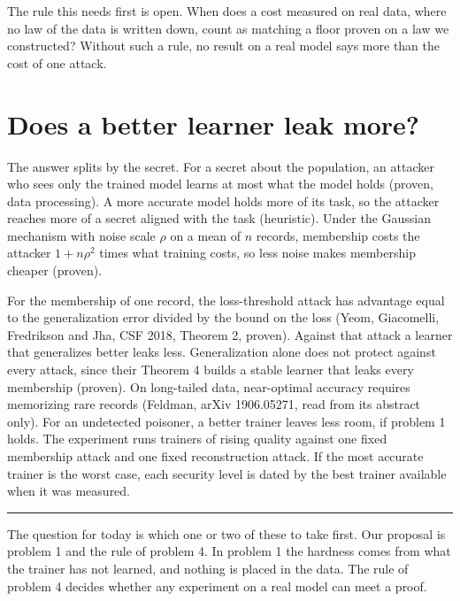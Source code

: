 \documentclass[10pt,a4paper]{article}
\newcommand{\redline}{\textcolor{kred}{\rule{\textwidth}{1pt}}}
\begin{document}
The rule this needs first is open. When does a cost measured on real data, where no law of the data is written down, count as matching a floor proven on a law we constructed? Without such a rule, no result on a real model says more than the cost of one attack.

\section{Does a better learner leak more?}

The answer splits by the secret. For a secret about the population, an attacker who sees only the trained model learns at most what the model holds (proven, data processing). A more accurate model holds more of its task, so the attacker reaches more of a secret aligned with the task (heuristic). Under the Gaussian mechanism with noise scale $\rho$ on a mean of $n$ records, membership costs the attacker $1+n\rho^2$ times what training costs, so less noise makes membership cheaper (proven).

For the membership of one record, the loss-threshold attack has advantage equal to the generalization error divided by the bound on the loss (Yeom, Giacomelli, Fredrikson and Jha, CSF 2018, Theorem 2, proven). Against that attack a learner that generalizes better leaks less. Generalization alone does not protect against every attack, since their Theorem 4 builds a stable learner that leaks every membership (proven). On long-tailed data, near-optimal accuracy requires memorizing rare records (Feldman, arXiv 1906.05271, read from its abstract only). For an undetected poisoner, a better trainer leaves less room, if problem 1 holds. The experiment runs trainers of rising quality against one fixed membership attack and one fixed reconstruction attack. If the most accurate trainer is the worst case, each security level is dated by the best trainer available when it was measured.

\medskip
\redline

The question for today is which one or two of these to take first. Our proposal is problem 1 and the rule of problem 4. In problem 1 the hardness comes from what the trainer has not learned, and nothing is placed in the data. The rule of problem 4 decides whether any experiment on a real model can meet a proof.
\end{document}
